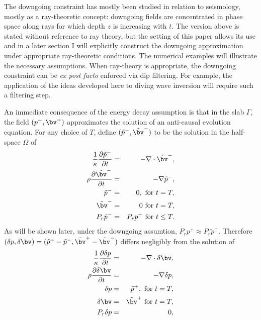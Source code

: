 The downgoing constraint has mostly been studied in relation to
seismology, mostly as a ray-theoretic concept: downgoing fields are
concentrated in phase space along rays for which depth $z$ is
increasing with $t$. The version above is stated without reference to
ray theory, but the setting of this paper allows its use and in a
later section I will explicitly construct the downgoing approximation
under appropriate ray-theoretic conditions. The numerical examples will
illustrate the necessary assumptions. When ray-theory is appropriate,
the downgoing constraint can be {\em ex post facto} enforced via dip
filtering. For example, the application of the ideas developed here to
diving wave inversion will require such a filtering step.

An immediate consequence of the energy decay assumption is that in the
slab $\Gamma$, the field $(p^+,\bv^+)$ approximates the solution of an
anti-causal evolution equation. For any choice of $T$, define
$(\tilde{p}^-,\tilde{\bv}^-)$ to be the solution in the half-space
$\Omega$ of
\begin{eqnarray}
\label{eqn:revawe}
  \frac{1}{\kappa}\frac{\partial \tilde{p}^-}{\partial t} & = & - \nabla \cdot \tilde{\bv}^-, \nonumber \\
  \rho\frac{\partial \tilde{\bv}^-}{\partial t} & = & - \nabla \tilde{p}^-,\nonumber \\
  \tilde{p}^- & =& 0,  \mbox{ for } t=T,\nonumber\\ 
  \tilde{\bv}^- & = & 0 \mbox{ for } t=T,\nonumber\\
  P_r\tilde{p}^- &=& P_rp^+ \mbox { for } t \le T . 
\end{eqnarray}
As will be shown later, under the downgoing assumtion, $P_r p^+
\approx P_r \tilde{p}^+$.
Therefore $(\delta p,\delta \bv)=(\tilde{p}^+-\tilde{p}^-,\tilde{\bv}^+-\tilde{\bv}^-)$
differs negligibly from the solution of
\begin{eqnarray}
\label{eqn:deltaawe}
  \frac{1}{\kappa}\frac{\partial \delta p}{\partial t} & = & -
                                                               \nabla
                                                               \cdot
                                                               \delta \bv, \nonumber \\
  \rho\frac{\partial \delta \bv}{\partial t} & = & - \nabla \delta p,\nonumber \\
  \delta p & =& \tilde{p}^+,  \mbox{ for } t=T,\nonumber\\ 
  \delta \bv & = & \tilde{\bv}^+ \mbox{ for } t=T,\nonumber\\
  P_r\delta p & = & 0,
\end{eqnarray}
